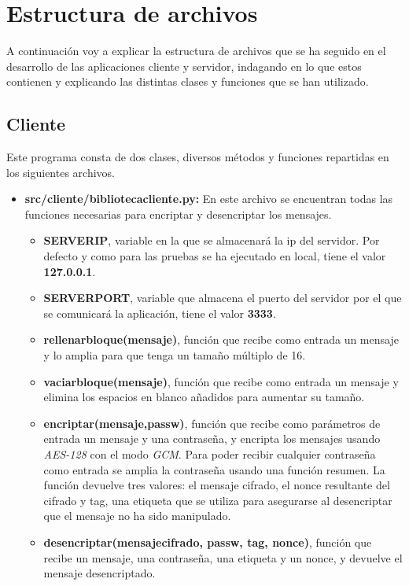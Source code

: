 \section{Estructura de archivos}
A continuación voy a explicar la estructura de archivos que se ha seguido en el desarrollo de las aplicaciones cliente y servidor, indagando en lo que estos contienen y explicando las distintas clases y funciones que se han utilizado. 

\subsection{Cliente}
Este programa consta de dos clases, diversos métodos y funciones repartidas en los siguientes archivos. 
\begin{itemize}
	\item \textbf{src/cliente/biblioteca\textunderscore cliente.py:} En este archivo se encuentran todas las funciones necesarias para encriptar y desencriptar los mensajes.
		\begin{itemize}
			\item \textbf{SERVER\textunderscore IP}, variable en la que se almacenará la ip del servidor. Por defecto y como para las pruebas se ha ejecutado en local, tiene el valor \textbf{127.0.0.1}.
			\item \textbf{SERVER\textunderscore PORT}, variable que almacena el puerto del servidor por el que se comunicará la aplicación, tiene el valor \textbf{3333}.
			\item \textbf{rellenar\textunderscore bloque(mensaje)}, función que recibe como entrada un mensaje y lo amplia para que tenga un tamaño múltiplo de 16.
			\item \textbf{vaciar\textunderscore bloque(mensaje)}, función que recibe como entrada un mensaje y elimina los espacios en blanco añadidos para aumentar su tamaño.
			\item \textbf{encriptar(mensaje,passw)}, función que recibe como parámetros de entrada un mensaje y una contraseña, y encripta los mensajes usando \emph{AES-128} con el modo \emph{GCM}. Para poder recibir cualquier contraseña como entrada se amplia la contraseña usando una función resumen. La función devuelve tres valores: el mensaje cifrado, el nonce resultante del cifrado y tag, una etiqueta que se utiliza para asegurarse al desencriptar que el mensaje no ha sido manipulado.
			\item \textbf{desencriptar(mensaje\textunderscore cifrado, passw, tag, nonce)}, función que recibe un mensaje, una contraseña, una etiqueta y un nonce, y devuelve el mensaje desencriptado.

\end{itemize}
\end{itemize}
